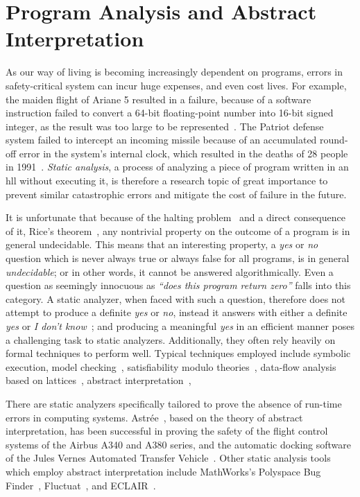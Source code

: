 \section{Program Analysis and Abstract Interpretation}
\label{bg:sec:abstract_interpretation}

As our way of living is becoming increasingly dependent on programs,
errors in safety-critical system can incur huge expenses, and even cost
lives.  For example, the maiden flight of Ariane 5 resulted in a failure,
because of a software instruction failed to convert a 64-bit floating-point
number into 16-bit signed integer, as the result was too large to be
represented~\cite{dowson97}.  The Patriot defense system failed to intercept
an incoming missile because of an accumulated round-off error in the
system's internal clock, which resulted in the deaths of 28 people in
1991~\cite{patriot}. \emph{Static analysis}, a process of analyzing a piece of
program written in an \gls{hll} without executing it, is therefore a research
topic of great importance to prevent similar catastrophic errors and mitigate
the cost of failure in the future.

It is unfortunate that because of the halting problem~\cite{turing37} and a
direct consequence of it, Rice's theorem~\cite{rice53}, any nontrivial property
on the outcome of a program is in general undecidable.  This means that an
interesting property, a \emph{yes} or \emph{no} question which is never always
true or always false for all programs, is in general \emph{undecidable};
or in other words, it cannot be answered algorithmically.  Even a question
as seemingly innocuous as \emph{``does this program return zero''} falls
into this category.  A static analyzer, when faced with such a question,
therefore does not attempt to produce a definite \emph{yes} or \emph{no},
instead it answers with either a definite \emph{yes} or \emph{I don't
know}~\cite{mine04}; and producing a meaningful \emph{yes} in an efficient
manner poses a challenging task to static analyzers.  Additionally, they
often rely heavily on formal techniques to perform well.  Typical techniques
employed include symbolic execution, model checking~\cite{kroening03},
satisfiability modulo theories~\cite{demoura08}, data-flow analysis based on
lattices~\cite{nielson99}, abstract interpretation~\cite{cousot77}, \etc{}

There are static analyzers specifically tailored to prove the absence of
run-time errors in computing systems.  Astr\'ee~\cite{astree}, based on
the theory of abstract interpretation, has been successful in proving the
safety of the flight control systems of the Airbus A340 and A380 series,
and the automatic docking software of the Jules Vernes Automated Transfer
Vehicle~\cite{dasia09}.  Other static analysis tools which employ abstract
interpretation include MathWorks's Polyspace Bug Finder~\cite{polyspace},
Fluctuat~\cite{Fluctuat}, and ECLAIR~\cite{eclair}.

